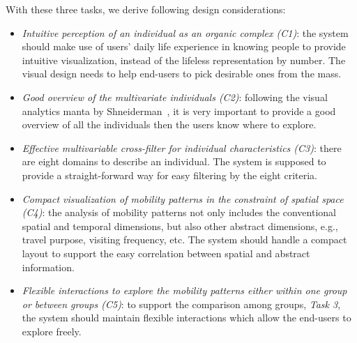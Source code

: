 With these three tasks, we derive following design considerations:

\begin{itemize}
\item \textit{Intuitive perception of an individual as an organic complex (C1)}: the system should make use of users' daily life experience in knowing people to provide intuitive visualization, instead of the lifeless representation by number. The visual design needs to help end-users to pick desirable ones from the mass.
\item \textit{Good overview of the multivariate individuals (C2)}: following the visual analytics manta by Shneiderman~\citep{RN459}, it is very important to provide a good overview of all the individuals then the users know where to explore.
\item \textit{Effective multivariable cross-filter for individual characteristics (C3)}: there are eight domains to describe an individual. The system is supposed to provide a straight-forward way for easy filtering by the eight criteria.
\item \textit{Compact visualization of mobility patterns in the constraint of spatial space (C4)}: the analysis of mobility patterns not only includes the conventional spatial and temporal dimensions, but also other abstract dimensions, e.g., travel purpose, visiting frequency, etc. The system should handle a compact layout to support the easy correlation between spatial and abstract information.
\item \textit{Flexible interactions to explore the mobility patterns either within one group or between groups (C5)}: to support the comparison among groups, \textit{Task 3}, the system should maintain flexible interactions which allow the end-users to explore freely.
\end{itemize}

